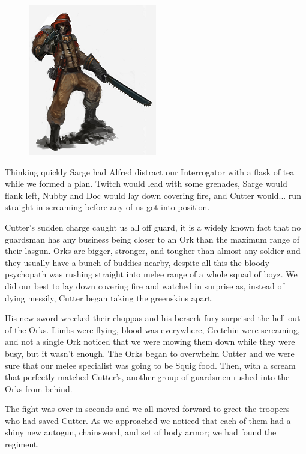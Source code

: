 \begin{figure}
	\begin{center}
		\includegraphics[width=\figwidth]{pics/4/17.png}
	\end{center}
\end{figure}
Thinking quickly Sarge had Alfred distract our Interrogator with a flask of tea while we formed a plan. 
Twitch would lead with some grenades, Sarge would flank left, Nubby and Doc would lay down covering fire, and Cutter would... run straight in screaming before any of us got into position.

Cutter's sudden charge caught us all off guard, it is a widely known fact that no guardsman has any business being closer to an Ork than the maximum range of their lasgun. 
Orks are bigger, stronger, and tougher than almost any soldier and they usually have a bunch of buddies nearby, despite all this the bloody psychopath was rushing straight into melee range of a whole squad of boyz. 
We did our best to lay down covering fire and watched in surprise as, instead of dying messily, Cutter began taking the greenskins apart. 

His new sword wrecked their choppas and his berserk fury surprised the hell out of the Orks. 
Limbs were flying, blood was everywhere, Gretchin were screaming, and not a single Ork noticed that we were mowing them down while they were busy, but it wasn't enough. 
The Orks began to overwhelm Cutter and we were sure that our melee specialist was going to be Squig food. 
Then, with a scream that perfectly matched Cutter's, another group of guardsmen rushed into the Orks from behind.

The fight was over in seconds and we all moved forward to greet the troopers who had saved Cutter. 
As we approached we noticed that each of them had a shiny new autogun, chainsword, and set of body armor; 
we had found the regiment.

